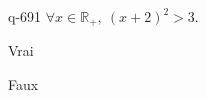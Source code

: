 \begin{truefalse}{q-691}
$\forall x \in \mathbb R_+,\: (x+2)^2>3$.
\item* Vrai
\item Faux
\end{truefalse}

